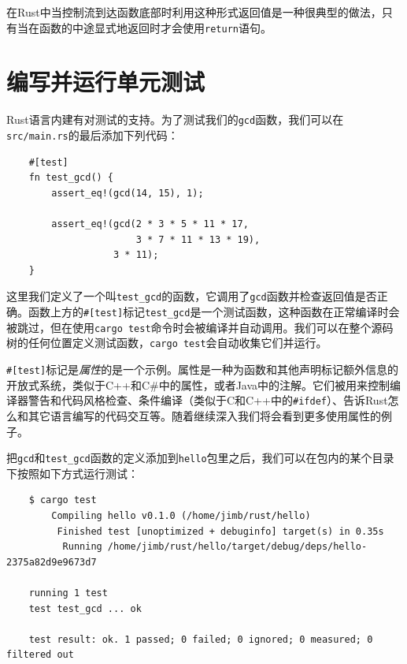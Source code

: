 在Rust中当控制流到达函数底部时利用这种形式返回值是一种很典型的做法，只有当在函数的中途显式地返回时才会使用\texttt{return}语句。

\section{编写并运行单元测试}\label{test}
Rust语言内建有对测试的支持。为了测试我们的\texttt{gcd}函数，我们可以在\texttt{src/main.rs}的最后添加下列代码：
\begin{verbatim}
    #[test]
    fn test_gcd() {
        assert_eq!(gcd(14, 15), 1);

        assert_eq!(gcd(2 * 3 * 5 * 11 * 17,
                       3 * 7 * 11 * 13 * 19),
                   3 * 11);
    }
\end{verbatim}

这里我们定义了一个叫\texttt{test\_gcd}的函数，它调用了\texttt{gcd}函数并检查返回值是否正确。函数上方的\texttt{\#[test]}标记\texttt{test\_gcd}是一个测试函数，这种函数在正常编译时会被跳过，但在使用\texttt{cargo test}命令时会被编译并自动调用。我们可以在整个源码树的任何位置定义测试函数，\texttt{cargo test}会自动收集它们并运行。

\texttt{\#[test]}标记是\emph{属性}的是一个示例。属性是一种为函数和其他声明标记额外信息的开放式系统，类似于C++和C\#中的属性，或者Java中的注解。它们被用来控制编译器警告和代码风格检查、条件编译（类似于C和C++中的\texttt{\#ifdef}）、告诉Rust怎么和其它语言编写的代码交互等。随着继续深入我们将会看到更多使用属性的例子。

把\texttt{gcd}和\texttt{test\_gcd}函数的定义添加到\texttt{hello}包里之后，我们可以在包内的某个目录下按照如下方式运行测试：
\begin{verbatim}
    $ cargo test
        Compiling hello v0.1.0 (/home/jimb/rust/hello)
         Finished test [unoptimized + debuginfo] target(s) in 0.35s
          Running /home/jimb/rust/hello/target/debug/deps/hello-2375a82d9e9673d7

    running 1 test
    test test_gcd ... ok
    
    test result: ok. 1 passed; 0 failed; 0 ignored; 0 measured; 0 filtered out
\end{verbatim}

